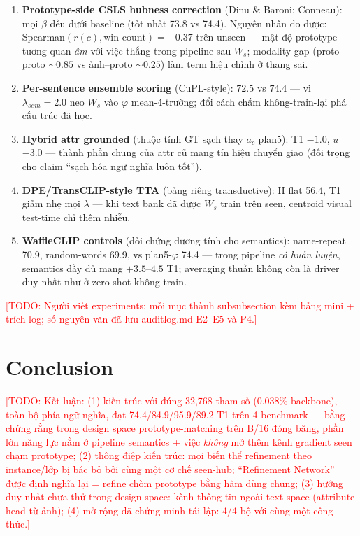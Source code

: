 \documentclass[10pt,twocolumn,letterpaper]{article}
\newcommand{\todo}[1]{\textcolor{red}{[TODO: #1]}}
\begin{document}
\begin{enumerate}
\item \textbf{Prototype-side CSLS hubness correction} (Dinu \& Baroni; Conneau): mọi $\beta$ đều dưới baseline (tốt nhất 73.8 vs 74.4). Nguyên nhân đo được: Spearman$(r(c),\text{win-count}) = -0.37$ trên unseen — mật độ prototype tương quan \emph{âm} với việc thắng trong pipeline sau $W_s$; modality gap (proto--proto ${\sim}0.85$ vs ảnh--proto ${\sim}0.25$) làm term hiệu chỉnh ở thang sai.
\item \textbf{Per-sentence ensemble scoring} (CuPL-style): $72.5$ vs $74.4$ — vì $\lambda_{sem}=2.0$ neo $W_s$ vào $\varphi$ mean-4-trường; đổi cách chấm không-train-lại phá cấu trúc đã học.
\item \textbf{Hybrid attr grounded} (thuộc tính GT sạch thay $a_c$ plan5): T1 $-1.0$, $u$ $-3.0$ — thành phần chung của attr cũ mang tín hiệu chuyển giao (đối trọng cho claim ``sạch hóa ngữ nghĩa luôn tốt'').
\item \textbf{DPE/TransCLIP-style TTA} (bảng riêng transductive): H flat 56.4, T1 giảm nhẹ mọi $\lambda$ — khi text bank đã được $W_s$ train trên seen, centroid visual test-time chỉ thêm nhiễu.
\item \textbf{WaffleCLIP controls} (đối chứng dương tính cho semantics): name-repeat 70.9, random-words 69.9, vs plan5-$\varphi$ 74.4 — trong pipeline \emph{có huấn luyện}, semantics đầy đủ mang $+3.5$--$4.5$ T1; averaging thuần không còn là driver duy nhất như ở zero-shot không train.
\end{enumerate}

\todo{Người viết experiments: mỗi mục thành subsubsection kèm bảng mini + trích log; số nguyên văn đã lưu auditlog.md E2--E5 và P4.}

\section{Conclusion}
\todo{Kết luận: (1) kiến trúc với đúng 32{,}768 tham số (0.038\% backbone), toàn bộ phía ngữ nghĩa, đạt 74.4/84.9/95.9/89.2 T1 trên 4 benchmark — bằng chứng rằng trong design space prototype-matching trên B/16 đóng băng, phần lớn năng lực nằm ở pipeline semantics + việc \emph{không} mở thêm kênh gradient seen chạm prototype; (2) thông điệp kiến trúc: mọi biến thể refinement theo instance/lớp bị bác bỏ bởi cùng một cơ chế seen-hub; ``Refinement Network'' được định nghĩa lại = refine chòm prototype bằng hàm dùng chung; (3) hướng duy nhất chưa thử trong design space: kênh thông tin ngoài text-space (attribute head từ ảnh); (4) mở rộng đã chứng minh tái lập: 4/4 bộ với cùng một công thức.}
\end{document}
